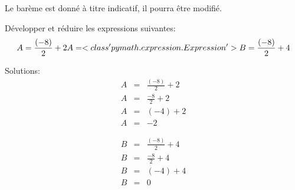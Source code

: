 \documentclass[a4paper,10pt]{/media/documents/Cours/Prof/Enseignements/Archive/2013-2014/tools/style/classDS}
\date{26 septemble 2013}
\begin{document}
\maketitle

\Calc
Le barème est donné à titre indicatif, il pourra être modifié.

\begin{Exo}[4.5]
    
    
    
		Développer et réduire les expressions suivantes:
		\begin{equation*}
            A = \frac{ ( -8 ) }{ 2 } + 2 \\
            A = <class 'pymath.expression.Expression'> \\
            B = \frac{ ( -8 ) }{ 2 } + 4
		\end{equation*}

        Solutions:
        \begin{eqnarray*}
A & = & \frac{ ( -8 ) }{ 2 } + 2 \\ 
A & = & \frac{ -8 }{ 2 } + 2 \\ 
A & = & ( -4 ) + 2 \\ 
A & = & -2
\end{eqnarray*}

        \begin{eqnarray*}
B & = & \frac{ ( -8 ) }{ 2 } + 4 \\ 
B & = & \frac{ -8 }{ 2 } + 4 \\ 
B & = & ( -4 ) + 4 \\ 
B & = & 0
\end{eqnarray*}

\end{Exo}
\end{document}
